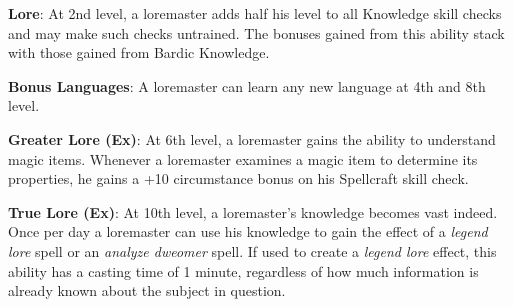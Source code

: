 				
\textbf{Lore}: At 2nd level, a loremaster adds half his level to all Knowledge skill checks and may make such checks untrained. The bonuses gained from this ability stack with those gained from Bardic Knowledge.
				
\textbf{Bonus Languages}: A loremaster can learn any new language at 4th and 8th level.
				
\textbf{Greater Lore (Ex)}: At 6th level, a loremaster gains the ability to understand magic items. Whenever a loremaster examines a magic item to determine its properties, he gains a +10 circumstance bonus on his Spellcraft skill check.
				
\textbf{True Lore (Ex)}: At 10th level, a loremaster's knowledge becomes vast indeed. Once per day a loremaster can use his knowledge to gain the effect of a \textit{legend lore }spell or an \textit{analyze dweomer }spell. If used to create a \textit{legend lore} effect, this ability has a casting time of 1 minute, regardless of how much information is already known about the subject in question.
        	
